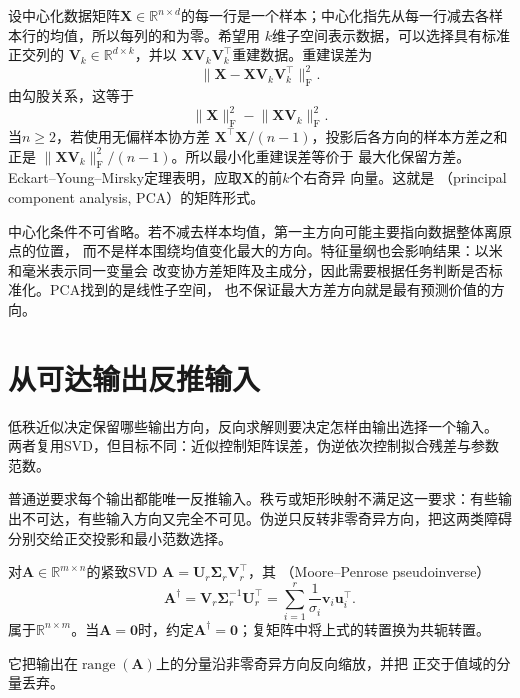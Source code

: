 设中心化数据矩阵$\bm{X}\in\mathbb{R}^{n\times d}$的每一行是一个样本；中心化指先从每一行减去各样本行的均值，所以每列的和为零。希望用
$k$维子空间表示数据，可以选择具有标准正交列的
$\bm{V}_k\in\mathbb{R}^{d\times k}$，并以
$\bm{X}\bm{V}_k\bm{V}_k^{\top}$重建数据。重建误差为
\[
  \lVert\bm{X}-\bm{X}\bm{V}_k\bm{V}_k^{\top}\rVert_{\mathrm{F}}^2.
\]
由勾股关系，这等于
\[
  \lVert\bm{X}\rVert_{\mathrm{F}}^2-
  \lVert\bm{X}\bm{V}_k\rVert_{\mathrm{F}}^2.
\]
当$n\geq2$，若使用无偏样本协方差
$\bm{X}^{\top}\bm{X}/(n-1)$，投影后各方向的样本方差之和正是
$\lVert\bm{X}\bm{V}_k\rVert_{\mathrm{F}}^2/(n-1)$。所以最小化重建误差等价于
最大化保留方差。Eckart--Young--Mirsky定理表明，应取$\bm{X}$的前$k$个右奇异
向量。这就是
（principal component analysis, PCA）的矩阵形式。

中心化条件不可省略。若不减去样本均值，第一主方向可能主要指向数据整体离原点的位置，
而不是样本围绕均值变化最大的方向。特征量纲也会影响结果：以米和毫米表示同一变量会
改变协方差矩阵及主成分，因此需要根据任务判断是否标准化。PCA找到的是线性子空间，
也不保证最大方差方向就是最有预测价值的方向。

\section{从可达输出反推输入}
\label{sec:matrix-analysis-inverse-input-selection}

低秩近似决定保留哪些输出方向，反向求解则要决定怎样由输出选择一个输入。
两者复用SVD，但目标不同：近似控制矩阵误差，伪逆依次控制拟合残差与参数范数。

普通逆要求每个输出都能唯一反推输入。秩亏或矩形映射不满足这一要求：有些输出不可达，有些输入方向又完全不可见。伪逆只反转非零奇异方向，把这两类障碍分别交给正交投影和最小范数选择。

\begin{definition}
\label{def:matrix-analysis-pseudoinverse}
对$\bm A\in\mathbb R^{m\times n}$的紧致SVD
$\bm{A}=\bm{U}_r\bm{\Sigma}_r\bm{V}_r^{\top}$，其
（Moore--Penrose pseudoinverse）
\begin{equation}
  \bm{A}^{\dagger}
  =
  \bm{V}_r\bm{\Sigma}_r^{-1}\bm{U}_r^{\top}
  =
  \sum_{i=1}^{r}\frac{1}{\sigma_i}
  \bm{v}_i\bm{u}_i^{\top}.
  \label{eq:matrix-analysis-pseudoinverse}
\end{equation}
属于$\mathbb R^{n\times m}$。当$\bm A=\bm0$时，约定$\bm A^{\dagger}=\bm0$；复矩阵中将上式的转置换为共轭转置。
\end{definition}
它把输出在$\operatorname{range}(\bm{A})$上的分量沿非零奇异方向反向缩放，并把
正交于值域的分量丢弃。

